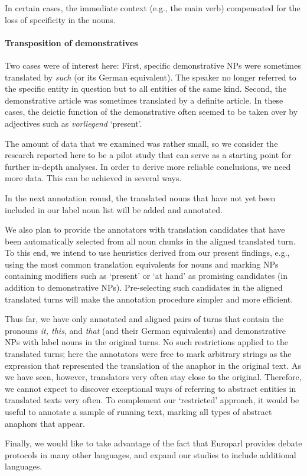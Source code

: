 \documentclass[output=paper]{LSP/langsci}
\begin{document}
In certain cases, the immediate context (e.g., the main verb) compensated for the loss of specificity in the nouns.

  
 \paragraph*{Transposition of demonstratives} Two cases were of interest here: First, specific demonstrative NPs were sometimes translated by \textit{such} (or its German equivalent). The speaker no longer referred to the specific entity in question but to all entities of the same kind. Second, the demonstrative article was sometimes translated by a definite article. In these cases, the deictic function of the demonstrative often seemed to be taken over by adjectives such as \textit{vorliegend} `present'.




The amount of data that we examined was rather small, so we consider the research reported here to be a pilot study that can serve as a starting point for further in-depth analyses. In order to derive more reliable conclusions, we need more data. This can be achieved in several ways.

In the next annotation round, the translated nouns that have not yet been included in our label noun list will be added and annotated.

We also plan to provide the annotators with translation candidates that have been automatically selected from all noun chunks in the aligned translated turn. To this end, we intend to use heuristics derived from our present findings, e.g., using the most common translation equivalents for nouns and marking NPs containing modifiers such as `present' or `at hand' as promising candidates (in addition to demonstrative NPs). Pre-selecting such candidates in the aligned translated turns will make the annotation procedure simpler and more efficient. 

Thus far, we have only annotated and aligned pairs of turns that contain the pronouns \textit{it, this}, and \textit{that} (and their German equivalents) and demonstrative NPs with label nouns in the original turns. No such restrictions applied to the translated turns; here the annotators were free to mark arbitrary strings as the expression that represented the translation of the anaphor in the original text. As we have seen, however, translators very often stay close to the original. Therefore, we cannot expect to discover exceptional ways of referring to abstract entities in translated texts very often. To complement our `restricted' approach, it would be useful to annotate a sample of running text, marking all types of abstract anaphors that appear. 

Finally, we would like to take advantage of the fact that Europarl provides debate protocols in many other languages, and expand our studies to include additional languages.

\sloppy
\printbibliography[heading=subbibliography,notkeyword=this] 
\end{document}
